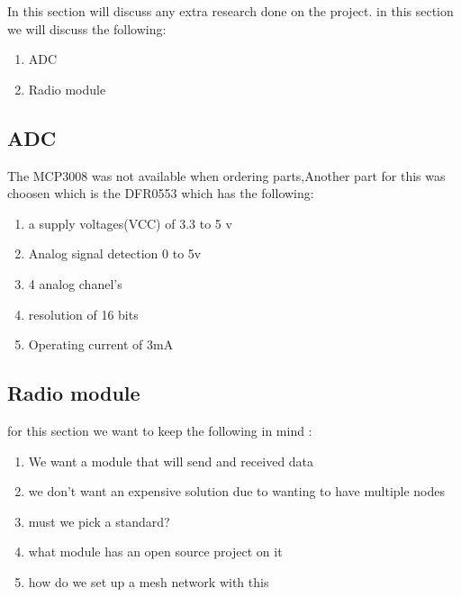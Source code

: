 In this section will discuss any extra research done on the project.
in this section we will discuss the following:
\begin{enumerate}
    \item ADC
    \item Radio module
\end{enumerate}
\subsection{ADC}
The MCP3008 was not  available when ordering parts,Another  part for this was choosen which is the  DFR0553 which has the following:
\begin{enumerate}
    \item a supply voltages(VCC) of 3.3 to 5 v
    \item Analog signal  detection 0 to 5v
    \item 4 analog chanel's
    \item resolution of 16 bits
    \item Operating current of 3mA
\end{enumerate}
\subsection{Radio module}
for  this  section we want  to keep  the following in mind :
\begin{enumerate}
    \item We want a module that will send  and  received data
    \item we don't  want  an  expensive solution due  to wanting to  have  multiple nodes
    \item must we pick a standard? 
    \item what module has  an open source project on it 
    \item how do we  set up  a   mesh network with this 
\end{enumerate}
